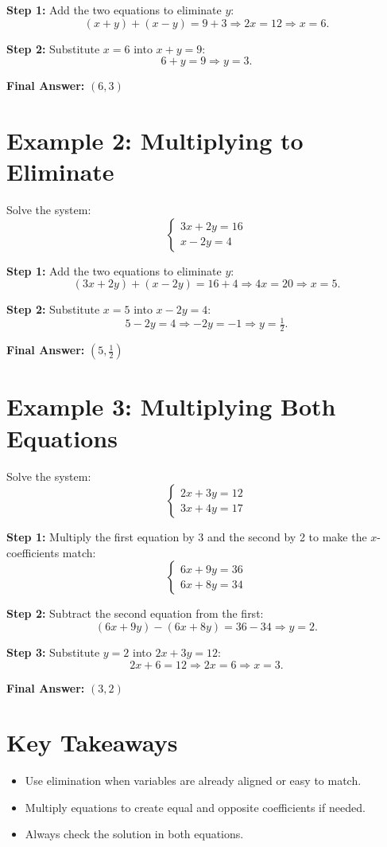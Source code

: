 \documentclass[14pt]{extarticle}
\begin{document}
\textbf{Step 1:} Add the two equations to eliminate \(y\):
\[
(x + y) + (x - y) = 9 + 3 \Rightarrow 2x = 12 \Rightarrow x = 6.
\]

\textbf{Step 2:} Substitute \(x = 6\) into \(x + y = 9\):
\[
6 + y = 9 \Rightarrow y = 3.
\]

\textbf{Final Answer:} \(\boxed{(6, 3)}\)

\section*{Example 2: Multiplying to Eliminate}

Solve the system:
\[
\begin{cases}
3x + 2y = 16 \\
x - 2y = 4
\end{cases}
\]

\textbf{Step 1:} Add the two equations to eliminate \(y\):
\[
(3x + 2y) + (x - 2y) = 16 + 4 \Rightarrow 4x = 20 \Rightarrow x = 5.
\]

\textbf{Step 2:} Substitute \(x = 5\) into \(x - 2y = 4\):
\[
5 - 2y = 4 \Rightarrow -2y = -1 \Rightarrow y = \tfrac{1}{2}.
\]

\textbf{Final Answer:} \(\boxed{(5, \tfrac{1}{2})}\)

\section*{Example 3: Multiplying Both Equations}

Solve the system:
\[
\begin{cases}
2x + 3y = 12 \\
3x + 4y = 17
\end{cases}
\]

\textbf{Step 1:} Multiply the first equation by 3 and the second by 2 to make the \(x\)-coefficients match:
\[
\begin{cases}
6x + 9y = 36 \\
6x + 8y = 34
\end{cases}
\]

\textbf{Step 2:} Subtract the second equation from the first:
\[
(6x + 9y) - (6x + 8y) = 36 - 34 \Rightarrow y = 2.
\]

\textbf{Step 3:} Substitute \(y = 2\) into \(2x + 3y = 12\):
\[
2x + 6 = 12 \Rightarrow 2x = 6 \Rightarrow x = 3.
\]

\textbf{Final Answer:} \(\boxed{(3, 2)}\)

\section*{Key Takeaways}
\begin{itemize}
    \item Use elimination when variables are already aligned or easy to match.
    \item Multiply equations to create equal and opposite coefficients if needed.
    \item Always check the solution in both equations.
\end{itemize}
\end{document}

